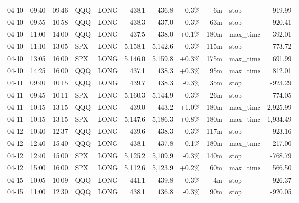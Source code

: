 \documentclass[11pt,a4paper,twoside]{article}
\begin{document}
\begin{center}
\begin{longtable}{>{\color{txtmain}}l l l l l r r r r >{\color{txtmain}}l r}
04-10 & 09:40 & 09:46 & QQQ & LONG & 438.1 & 436.8 & \textcolor{lossred}{-0.3\%} & 6m & stop & \textcolor{lossred}{-919.99} \\
04-10 & 09:55 & 10:58 & QQQ & LONG & 438.3 & 437.0 & \textcolor{lossred}{-0.3\%} & 63m & stop & \textcolor{lossred}{-920.41} \\
04-10 & 11:00 & 14:00 & QQQ & LONG & 437.5 & 438.0 & \textcolor{wingreen}{+0.1\%} & 180m & max\_time & \textcolor{wingreen}{392.01} \\
04-10 & 11:10 & 13:05 & SPX & LONG & 5,158.1 & 5,142.6 & \textcolor{lossred}{-0.3\%} & 115m & stop & \textcolor{lossred}{-773.72} \\
04-10 & 13:05 & 16:00 & SPX & LONG & 5,146.0 & 5,159.8 & \textcolor{wingreen}{+0.3\%} & 175m & max\_time & \textcolor{wingreen}{691.99} \\
04-10 & 14:25 & 16:00 & QQQ & LONG & 437.1 & 438.3 & \textcolor{wingreen}{+0.3\%} & 95m & max\_time & \textcolor{wingreen}{812.01} \\
04-11 & 09:40 & 10:15 & QQQ & LONG & 439.7 & 438.3 & \textcolor{lossred}{-0.3\%} & 35m & stop & \textcolor{lossred}{-923.29} \\
04-11 & 09:45 & 10:11 & SPX & LONG & 5,160.3 & 5,144.9 & \textcolor{lossred}{-0.3\%} & 26m & stop & \textcolor{lossred}{-774.05} \\
04-11 & 10:15 & 13:15 & QQQ & LONG & 439.0 & 443.2 & \textcolor{wingreen}{+1.0\%} & 180m & max\_time & \textcolor{wingreen}{2,925.99} \\
04-11 & 10:15 & 13:15 & SPX & LONG & 5,147.6 & 5,186.3 & \textcolor{wingreen}{+0.8\%} & 180m & max\_time & \textcolor{wingreen}{1,934.49} \\
04-12 & 10:40 & 12:37 & QQQ & LONG & 439.6 & 438.3 & \textcolor{lossred}{-0.3\%} & 117m & stop & \textcolor{lossred}{-923.16} \\
04-12 & 12:40 & 15:40 & QQQ & LONG & 438.1 & 437.8 & \textcolor{lossred}{-0.1\%} & 180m & max\_time & \textcolor{lossred}{-217.00} \\
04-12 & 12:40 & 15:00 & SPX & LONG & 5,125.2 & 5,109.9 & \textcolor{lossred}{-0.3\%} & 140m & stop & \textcolor{lossred}{-768.79} \\
04-12 & 15:00 & 16:00 & SPX & LONG & 5,112.6 & 5,123.9 & \textcolor{wingreen}{+0.2\%} & 60m & max\_time & \textcolor{wingreen}{566.50} \\
04-15 & 10:05 & 10:09 & QQQ & LONG & 441.1 & 439.8 & \textcolor{lossred}{-0.3\%} & 4m & stop & \textcolor{lossred}{-926.37} \\
04-15 & 11:00 & 12:30 & QQQ & LONG & 438.1 & 436.8 & \textcolor{lossred}{-0.3\%} & 90m & stop & \textcolor{lossred}{-920.05} \\

\end{longtable}
\end{center}
\end{document}
